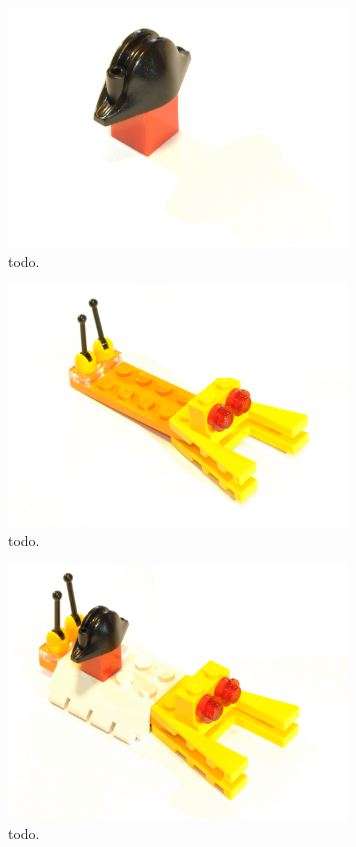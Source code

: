 	\begin{figure}[ht!]
		\centering
		\includegraphics[width=90mm]{images/rawImages/BILD_4}
		\caption{todo.}
		\label{todo}
	\end{figure}
	
	\begin{figure}[ht!]
		\centering
		\includegraphics[width=90mm]{images/rawImages/BILD_5}
		\caption{todo.}
		\label{todo}
	\end{figure}
	
	\begin{figure}[ht!]
		\centering
		\includegraphics[width=90mm]{images/rawImages/BILD_6}
		\caption{todo.}
		\label{todo}
	\end{figure}
	
